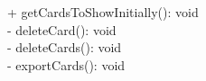 { 
    + getCardsToShowInitially(): void\\
    - deleteCard(): void\\
    - deleteCards(): void\\
    - exportCards(): void\\		
}{}